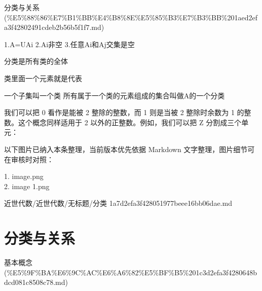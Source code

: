 \begin{note}[来源上级主题]

分类与关系 (\%E5\%88\%86\%E7\%B1\%BB\%E4\%B8\%8E\%E5\%85\%B3\%E7\%B3\%BB\%201aed2efa3f42802491cdeb2b56b5f1f7.md)

\end{note}

\begin{note}[分类]

1.A=UAi  2.Ai非空    3.任意Ai和Aj交集是空

分类是所有类的全体

类里面一个元素就是代表

一个子集叫一个类     所有属于一个类的元素组成的集合叫做A的一个分类

我们可以把 0 看作是能被 2 整除的整数，而 1 则是当被 2 整除时余数为 1 的整数。这个概念同样适用于 2 以外的正整数。例如，我们可以把 Z 分割成三个单元：

\end{note}

\begin{note}[关联图片]
以下图片已纳入本条整理，当前版本优先依据 Markdown 文字整理，图片细节可在审核时对照：

1. image.png\\
2. image 1.png\\

\end{note}

\begin{note}[来源路径]

近世代数/近世代数/无标题/分类 1a7d2efa3f428051977beee16bb06dae.md

\end{note}

\section*{分类与关系}

\begin{note}[来源上级主题]

基本概念 (\%E5\%9F\%BA\%E6\%9C\%AC\%E6\%A6\%82\%E5\%BF\%B5\%201c3d2efa3f4280648bdcd081c8508c78.md)

\end{note}


